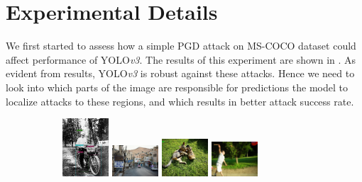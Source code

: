 \documentclass[letterpaper]{article}
\begin{document}
\section{Experimental Details}
We first started to assess  how a simple PGD attack on MS-COCO dataset could affect performance of YOLO\emph{v3}. The results of this experiment are shown in . As evident from results, YOLO\emph{v3} is robust against these attacks. Hence we need to look into which parts of the image are responsible for predictions the model to localize attacks to these regions, and which results in better attack success rate.\\
\begin{figure}[h]
    \begin{subfigure}{\textwidth}
        \includegraphics[width = 0.19\textwidth, height = 0.25\textwidth]{Images/Yolo-MS-COCO-original/det_test1.jpg}
        \includegraphics[width = 0.19\textwidth, height = 0.25\textwidth]{Images/Yolo-MS-COCO-original/det_test2.jpg}
        \includegraphics[width = 0.19\textwidth, height = 0.25\textwidth]{Images/Yolo-MS-COCO-original/det_test3.jpg}
        \includegraphics[width = 0.19\textwidth, height = 0.25\textwidth]{Images/Yolo-MS-COCO-original/det_test4.jpg}

\end{subfigure}
\end{figure}
\end{document}
